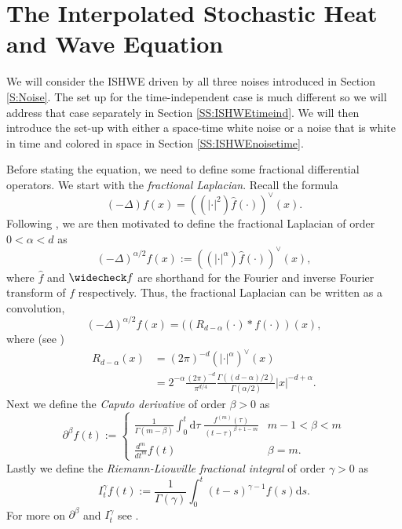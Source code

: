 \documentclass[12pt]{report}
\theoremstyle{plain}
\theoremstyle{definition}
\numberwithin{equation}{section}
\newcommand{\ud}{\ensuremath{ \mathrm{d} }}
\begin{document}
\section { \normalfont The Interpolated Stochastic Heat and Wave Equation} \label{S:ISHWE}

We will consider the ISHWE driven by all three noises introduced in Section \ref{S:Noise}. The set up for the time-independent case is much different so we will address that case separately in Section \ref{SS:ISHWEtimeind}. We will then introduce the set-up with either a space-time white noise or a noise that is white in time and colored in space in Section \ref{SS:ISHWEnoisetime}.

Before stating the equation, we need to define some fractional differential operators. We start with the {\em fractional Laplacian}. Recall the formula
	\[
	(-\Delta) f (x) = ((|\cdot|^{2})\hat{f}(\cdot))^{\vee}(x).
	\]
Following \cite{grafakos:14:modern}, we are then motivated to define the fractional Laplacian of order $0 < \alpha < d$ as
	\begin{equation} \label{D:fraclaplacian}
		(-\Delta)^{\alpha / 2} f (x) := ((|\cdot|^{\alpha})\hat{f}(\cdot))^{\vee}(x),
	\end{equation}
where $\widehat f$ and $\widecheck f$ are shorthand for the Fourier and inverse Fourier transform of $f$ respectively. Thus, the fractional Laplacian can be written as a convolution,
	\[
			(-\Delta)^{\alpha / 2} f (x) = ( (R_{d-\alpha}(\cdot) * f(\cdot)) (x),
	\]
where (see \cite[Example 1.3]{balan.chen.chen:03:invariant})
	\begin{align*}
		R_{d-\alpha}(x) &= (2\pi)^{-d} (|\cdot|^\alpha)^{\vee}(x) \\
		& = 2^{-\alpha} \frac{(2\pi)^{-d}}{\pi^{d/4}} \frac{\Gamma((d-\alpha)/2)}{\Gamma(\alpha/2)}|x|^{-d+\alpha}.
	\end{align*}
Next we define the {\em Caputo derivative} of order $\beta > 0$ as 
	\[ \partial^{\beta}f(t) :=
		\begin{cases}
			\frac{1}{\Gamma(m- \beta)} \int_0^t \ud \tau \; \frac{f^{(m)}(\tau) }{(t-\tau)^{\beta + 1 -m}} & m-1 < \beta < m \\
			\frac{d^m}{dt^m}f(t) & \beta = m.
		\end{cases}
	\]
Lastly we define the {\em Riemann-Liouville fractional integral} of order $\gamma > 0$ as 
	\[
		I_t^{\gamma} f(t) := \frac{1}{\Gamma(\gamma)} \int_0^t (t-s)^{\gamma -1} f(s) \ud s.
	\]
For more on $\partial^{\beta}$ and $I_t^{\gamma}$ see \cite{podlubny.1999}.
\end{document}

